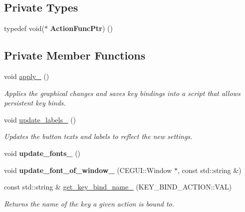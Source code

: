 \subsection*{Private Types}
\begin{DoxyCompactItemize}
\item 
typedef void($\ast$ {\bfseries Action\+Func\+Ptr}) ()\hypertarget{class_options_window_a5f01e3cb1c649c429ff4e8f3cfeda350}{}\label{class_options_window_a5f01e3cb1c649c429ff4e8f3cfeda350}

\end{DoxyCompactItemize}
\subsection*{Private Member Functions}
\begin{DoxyCompactItemize}
\item 
void \hyperlink{class_options_window_a4bde7704e95b5ee4fb80bbf2b325c16b}{apply\+\_\+} ()
\begin{DoxyCompactList}\small\item\em Applies the graphical changes and saves key bindings into a script that allows persistent key binds. \end{DoxyCompactList}\item 
void \hyperlink{class_options_window_a357e35144c8067c54cd12907dd11417b}{update\+\_\+labels\+\_\+} ()
\begin{DoxyCompactList}\small\item\em Updates the button texts and labels to reflect the new settings. \end{DoxyCompactList}\item 
void {\bfseries update\+\_\+fonts\+\_\+} ()\hypertarget{class_options_window_ab1629d4e6c35737a8e7588d1ce99fb5d}{}\label{class_options_window_ab1629d4e6c35737a8e7588d1ce99fb5d}

\item 
void {\bfseries update\+\_\+font\+\_\+of\+\_\+window\+\_\+} (C\+E\+G\+U\+I\+::\+Window $\ast$, const std\+::string \&)\hypertarget{class_options_window_acfebf79f3daf208868565b185634e641}{}\label{class_options_window_acfebf79f3daf208868565b185634e641}

\item 
const std\+::string \& \hyperlink{class_options_window_a949bdb318ae5834f72eb906076941842}{get\+\_\+key\+\_\+bind\+\_\+name\+\_\+} (K\+E\+Y\+\_\+\+B\+I\+N\+D\+\_\+\+A\+C\+T\+I\+O\+N\+::\+V\+AL)
\begin{DoxyCompactList}\small\item\em Returns the name of the key a given action is bound to. \end{DoxyCompactList}\end{DoxyCompactItemize}
